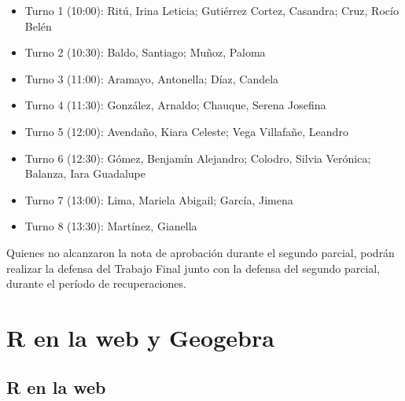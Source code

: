 \documentclass[
  spanish,
  letterpaper,
  DIV=11,
  numbers=noendperiod]{scrreprt}
\providecommand{\tightlist}{%
  \setlength{\itemsep}{0pt}\setlength{\parskip}{0pt}}
\begin{document}
\begin{tcolorbox}[enhanced jigsaw, arc=.35mm, bottomrule=.15mm, bottomtitle=1mm, breakable, colback=white, colbacktitle=quarto-callout-note-color!10!white, colframe=quarto-callout-note-color-frame, coltitle=black, left=2mm, leftrule=.75mm, opacityback=0, opacitybacktitle=0.6, rightrule=.15mm, title=\textcolor{quarto-callout-note-color}{\faInfo}\hspace{0.5em}{Orden de defensas propuesto}, titlerule=0mm, toprule=.15mm, toptitle=1mm]

\begin{itemize}
\tightlist
\item
  Turno 1 (10:00): Ritú, Irina Leticia; Gutiérrez Cortez, Casandra;
  Cruz, Rocío Belén
\item
  Turno 2 (10:30): Baldo, Santiago; Muñoz, Paloma
\item
  Turno 3 (11:00): Aramayo, Antonella; Díaz, Candela
\item
  Turno 4 (11:30): González, Arnaldo; Chauque, Serena Josefina
\item
  Turno 5 (12:00): Avendaño, Kiara Celeste; Vega Villafañe, Leandro
\item
  Turno 6 (12:30): Gómez, Benjamín Alejandro; Colodro, Silvia Verónica;
  Balanza, Iara Guadalupe
\item
  Turno 7 (13:00): Lima, Mariela Abigail; García, Jimena
\item
  Turno 8 (13:30): Martínez, Gianella
\end{itemize}

\end{tcolorbox}

Quienes no alcanzaron la nota de aprobación durante el segundo parcial,
podrán realizar la defensa del Trabajo Final junto con la defensa del
segundo parcial, durante el período de recuperaciones.


\chapter*{R en la web y Geogebra}\label{r-en-la-web-y-geogebra}


\section*{R en la web}\label{r-en-la-web}
\end{document}
